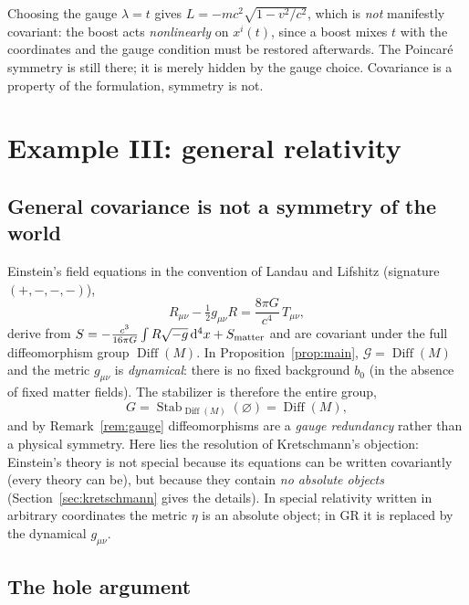 \documentclass[11pt,a4paper,openany]{book}
\theoremstyle{definition}
\theoremstyle{plain}
\theoremstyle{remark}
\newcommand{\dd}{\mathrm{d}}
\DeclareMathOperator{\Stab}{Stab}
\DeclareMathOperator{\Diff}{Diff}
\begin{document}
Choosing the gauge $\lambda=t$ gives
$L=-mc^2\sqrt{1-v^2/c^2}$, which is \emph{not} manifestly covariant: the
boost acts \emph{nonlinearly} on $x^i(t)$, since a boost mixes $t$ with the
coordinates and the gauge condition must be restored afterwards. The
Poincar\'e symmetry is still there; it is merely hidden by the gauge choice.
Covariance is a property of the formulation, symmetry is not.

\section{Example III: general relativity}
\label{sec:gr}

\subsection{General covariance is not a symmetry of the world}

Einstein's field equations in the convention of Landau and Lifshitz
(signature $(+,-,-,-)$),
\begin{equation}\label{eq:einstein}
  R_{\mu\nu}-\tfrac12 g_{\mu\nu}R=\frac{8\pi G}{c^4}\,T_{\mu\nu},
\end{equation}
derive from $S=-\tfrac{c^3}{16\pi G}\int R\sqrt{-g}\,\dd^4x+S_{\rm matter}$
and are covariant under the full diffeomorphism group $\Diff(M)$. In
Proposition~\ref{prop:main}, $\mathcal G=\Diff(M)$ and the metric $g_{\mu\nu}$
is \emph{dynamical}: there is no fixed background $b_0$ (in the absence of
fixed matter fields). The stabilizer is therefore the entire group,
\begin{equation}
  G=\Stab_{\Diff(M)}(\varnothing)=\Diff(M),
\end{equation}
and by Remark~\ref{rem:gauge} diffeomorphisms are a \emph{gauge redundancy}
rather than a physical symmetry. Here lies the resolution of Kretschmann's
objection: Einstein's theory is not special because its equations can be
written covariantly (every theory can be), but because they contain
\emph{no absolute objects} \cite{anderson} (Section~\ref{sec:kretschmann} gives
the details). In special relativity written in arbitrary coordinates the metric $\eta$ is an absolute object; in GR it is
replaced by the dynamical $g_{\mu\nu}$.

\subsection{The hole argument}
\end{document}
